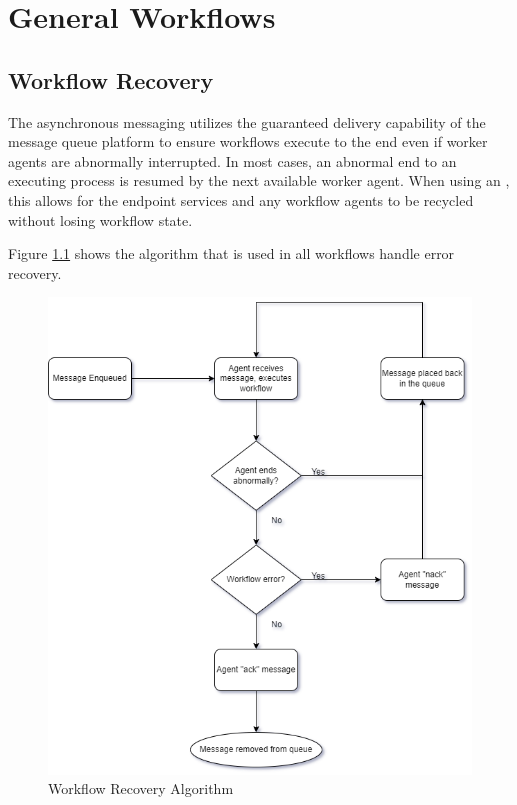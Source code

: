 \chapter{General Workflows}\label{sec:general-workflows}


\section{Workflow Recovery}\label{sec:recovery-workflow}

The asynchronous messaging utilizes the guaranteed delivery capability of the message queue platform
to ensure workflows execute to the end even if worker agents are abnormally interrupted.  In most cases,
an abnormal end to an executing process is resumed by the next available worker agent.  
When using an , this allows for the \cxoneflow endpoint services and
any workflow agents to be recycled without losing workflow state.

Figure \ref{fig:recovery-flowchart} shows the algorithm that is used
in all workflows handle error recovery.  


\begin{figure}[ht]
    \includegraphics[width=\textwidth]{graphics/cxoneflow-diagrams-Recovery Algorithm.png}
    \caption{Workflow Recovery Algorithm}
    \label{fig:recovery-flowchart}
\end{figure}

